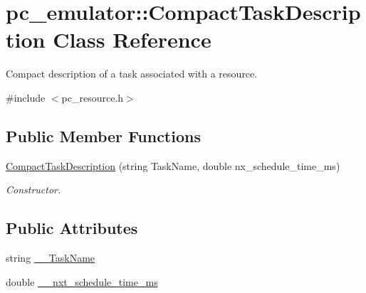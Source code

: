 \hypertarget{classpc__emulator_1_1CompactTaskDescription}{}\section{pc\+\_\+emulator\+:\+:Compact\+Task\+Description Class Reference}
\label{classpc__emulator_1_1CompactTaskDescription}


Compact description of a task associated with a resource.  




{\ttfamily \#include $<$pc\+\_\+resource.\+h$>$}

\subsection*{Public Member Functions}
\begin{DoxyCompactItemize}
\item 
\hyperlink{classpc__emulator_1_1CompactTaskDescription_ad492c9f478f13fed82a02c6bd1e04b42}{Compact\+Task\+Description} (string Task\+Name, double nx\+\_\+schedule\+\_\+time\+\_\+ms)\hypertarget{classpc__emulator_1_1CompactTaskDescription_ad492c9f478f13fed82a02c6bd1e04b42}{}\label{classpc__emulator_1_1CompactTaskDescription_ad492c9f478f13fed82a02c6bd1e04b42}

\begin{DoxyCompactList}\small\item\em Constructor. \end{DoxyCompactList}\end{DoxyCompactItemize}
\subsection*{Public Attributes}
\begin{DoxyCompactItemize}
\item 
string \hyperlink{classpc__emulator_1_1CompactTaskDescription_aa30ec0540777f34e779bb4dea60fb319}{\+\_\+\+\_\+\+Task\+Name}
\item 
double \hyperlink{classpc__emulator_1_1CompactTaskDescription_a48bc5f3d160ff382cc8aa3c3cf22c318}{\+\_\+\+\_\+nxt\+\_\+schedule\+\_\+time\+\_\+ms}
\end{DoxyCompactItemize}
